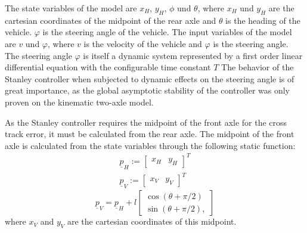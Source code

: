 \documentclass[arbeit=studie,oneside,BCOR=12mm]{ArbeitRST}
\begin{document}
The state variables of the model are $x_H$, $y_H$, $\phi$ und $\theta$, where
$x_H$ und $y_H$ are the cartesian coordinates of the midpoint of the rear axle
and $\theta$ is the heading of the vehicle. $\varphi$ is the steering angle of
the vehicle. The input variables of the model are $v$ und $\varphi$, where $v$
is the velocity of the vehicle and $\varphi$ is the steering angle. The
steering angle $\varphi$ is itself a dynamic system represented by a first
order linear differential equation with the configurable time constant $T$  The
behavior of the Stanley controller when subjected to dynamic effects on the
steering angle is of great importance, as the global asymptotic stability of
the controller was only proven on the kinematic two-axle model.

As the Stanley controller requires the midpoint of the front axle for the cross
track error, it must be calculated from the rear axle. The midpoint of the
front axle is calculated from the state variables through the following static
function:
\begin{gather}
  \underline{p}_H := 
  \begin{bmatrix}
    x_H & y_H
  \end{bmatrix}^T \\
  \underline{p}_V := 
  \begin{bmatrix}
    x_V & y_V
  \end{bmatrix}^T
  \label{eq:Rear Axle and Front Axle}
\end{gather}
\begin{equation}
  \underline{p}_V = \underline{p}_H + l 
  \begin{bmatrix}
    \cos(\theta + \pi/2) \\ 
    \sin(\theta + \pi/2),
  \end{bmatrix}
  \label{eq:Transformation from Rear Axle to Front Axle}
\end{equation}
where $x_V$ and $y_V$ are the cartesian coordinates of this midpoint. 
\end{document}
